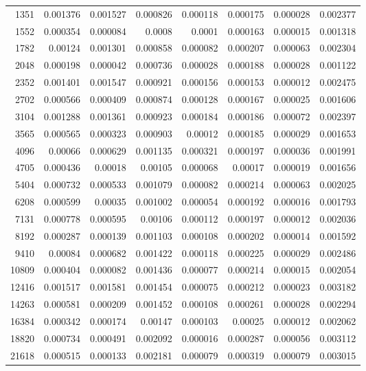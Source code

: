 \begin{longtable}{r r r r r r r r}
1351 & 0.001376 & 0.001527 & 0.000826 & 0.000118 & 0.000175 & 0.000028 & 0.002377 \\
1552 & 0.000354 & 0.000084 & 0.0008 & 0.0001 & 0.000163 & 0.000015 & 0.001318 \\
1782 & 0.00124 & 0.001301 & 0.000858 & 0.000082 & 0.000207 & 0.000063 & 0.002304 \\
2048 & 0.000198 & 0.000042 & 0.000736 & 0.000028 & 0.000188 & 0.000028 & 0.001122 \\
2352 & 0.001401 & 0.001547 & 0.000921 & 0.000156 & 0.000153 & 0.000012 & 0.002475 \\
2702 & 0.000566 & 0.000409 & 0.000874 & 0.000128 & 0.000167 & 0.000025 & 0.001606 \\
3104 & 0.001288 & 0.001361 & 0.000923 & 0.000184 & 0.000186 & 0.000072 & 0.002397 \\
3565 & 0.000565 & 0.000323 & 0.000903 & 0.00012 & 0.000185 & 0.000029 & 0.001653 \\
4096 & 0.00066 & 0.000629 & 0.001135 & 0.000321 & 0.000197 & 0.000036 & 0.001991 \\
4705 & 0.000436 & 0.00018 & 0.00105 & 0.000068 & 0.00017 & 0.000019 & 0.001656 \\
5404 & 0.000732 & 0.000533 & 0.001079 & 0.000082 & 0.000214 & 0.000063 & 0.002025 \\
6208 & 0.000599 & 0.00035 & 0.001002 & 0.000054 & 0.000192 & 0.000016 & 0.001793 \\
7131 & 0.000778 & 0.000595 & 0.00106 & 0.000112 & 0.000197 & 0.000012 & 0.002036 \\
8192 & 0.000287 & 0.000139 & 0.001103 & 0.000108 & 0.000202 & 0.000014 & 0.001592 \\
9410 & 0.00084 & 0.000682 & 0.001422 & 0.000118 & 0.000225 & 0.000029 & 0.002486 \\
10809 & 0.000404 & 0.000082 & 0.001436 & 0.000077 & 0.000214 & 0.000015 & 0.002054 \\
12416 & 0.001517 & 0.001581 & 0.001454 & 0.000075 & 0.000212 & 0.000023 & 0.003182 \\
14263 & 0.000581 & 0.000209 & 0.001452 & 0.000108 & 0.000261 & 0.000028 & 0.002294 \\
16384 & 0.000342 & 0.000174 & 0.00147 & 0.000103 & 0.00025 & 0.000012 & 0.002062 \\
18820 & 0.000734 & 0.000491 & 0.002092 & 0.000016 & 0.000287 & 0.000056 & 0.003112 \\
21618 & 0.000515 & 0.000133 & 0.002181 & 0.000079 & 0.000319 & 0.000079 & 0.003015 \\

\end{longtable}
